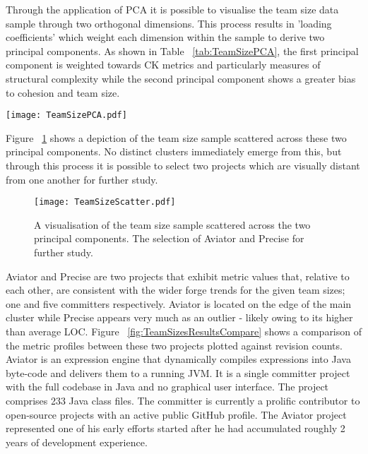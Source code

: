 Through the application of PCA it is possible to visualise the team size data sample through two orthogonal dimensions. This process results in 'loading coefficients' which weight each dimension within the sample to derive two principal components. As shown in Table ~\ref{tab:TeamSizePCA}, the first principal component is weighted towards CK metrics and particularly measures of structural complexity while the second principal component shows a greater bias to cohesion and team size.

\begin{table}
\begin{tabular}
 \centering 
 \texttt{[image: TeamSizePCA.pdf]}
 \label{tab:TeamSizePCA}
\end{tabular}
\end{table}

Figure ~\ref{fig:TeamSizeScatter} shows a depiction of the team size sample scattered across these two principal components. No distinct clusters immediately emerge from this, but through this process it is possible to select two projects which are visually distant from one another for further study.

\begin{figure}[htbp!] 
\centering    
\texttt{[image: TeamSizeScatter.pdf]}
\caption{A visualisation of the team size sample scattered across the two principal components. The selection of Aviator and Precise for further study.}
\label{fig:TeamSizeScatter}
\end{figure}

Aviator and Precise are two projects that exhibit metric values that, relative to each other, are consistent with the wider forge trends for the given team sizes; one and five committers respectively. Aviator is located on the edge of the main cluster while Precise appears very much as an outlier - likely owing to its higher than average LOC. Figure ~\ref{fig:TeamSizesResultsCompare} shows a comparison of the metric profiles between these two projects plotted against revision counts. Aviator is an expression engine that dynamically compiles expressions into Java byte-code and delivers them to a running JVM. It is a single committer project with the full codebase in Java and no graphical user interface. The project comprises 233 Java class files. The committer is currently a prolific contributor to open-source projects with an active public GitHub profile. The Aviator project represented one of his early efforts started after he had accumulated roughly 2 years of development experience. 

